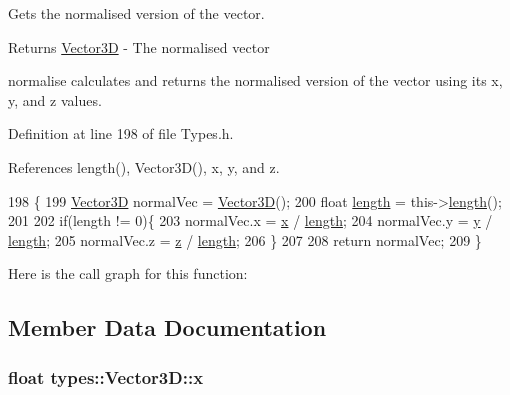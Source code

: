 Gets the normalised version of the vector. 

\begin{DoxyReturn}{Returns}
\hyperlink{structtypes_1_1_vector3_d}{Vector3\+D} -\/ The normalised vector
\end{DoxyReturn}
normalise calculates and returns the normalised version of the vector using its x, y, and z values. 

Definition at line 198 of file Types.\+h.



References length(), Vector3\+D(), x, y, and z.


\begin{DoxyCode}
198                             \{
199             \hyperlink{structtypes_1_1_vector3_d_a72a49411a6d9096033e8cfca88849ffe}{Vector3D} normalVec = \hyperlink{structtypes_1_1_vector3_d_a72a49411a6d9096033e8cfca88849ffe}{Vector3D}();
200             \textcolor{keywordtype}{float} \hyperlink{structtypes_1_1_vector3_d_a65bef5482d7d9c99a6e5b0f4bde68b08}{length} = this->\hyperlink{structtypes_1_1_vector3_d_a65bef5482d7d9c99a6e5b0f4bde68b08}{length}();
201 
202             \textcolor{keywordflow}{if}(length != 0)\{
203                 normalVec.x = \hyperlink{structtypes_1_1_vector3_d_a67f804e2d8b267b8196415f12a44b517}{x} / \hyperlink{structtypes_1_1_vector3_d_a65bef5482d7d9c99a6e5b0f4bde68b08}{length};
204                 normalVec.y = \hyperlink{structtypes_1_1_vector3_d_a02f330a5f3139f9cc3c5aead1728147c}{y} / \hyperlink{structtypes_1_1_vector3_d_a65bef5482d7d9c99a6e5b0f4bde68b08}{length};
205                 normalVec.z = \hyperlink{structtypes_1_1_vector3_d_a4266d5bca7826efcfb1fb6454affb51d}{z} / \hyperlink{structtypes_1_1_vector3_d_a65bef5482d7d9c99a6e5b0f4bde68b08}{length};
206             \}
207 
208             \textcolor{keywordflow}{return} normalVec;
209         \}
\end{DoxyCode}


Here is the call graph for this function\+:




\subsection{Member Data Documentation}
\hypertarget{structtypes_1_1_vector3_d_a67f804e2d8b267b8196415f12a44b517}{}
\subsubsection[{x}]{\setlength{\rightskip}{0pt plus 5cm}float types\+::\+Vector3\+D\+::x}\label{structtypes_1_1_vector3_d_a67f804e2d8b267b8196415f12a44b517}


